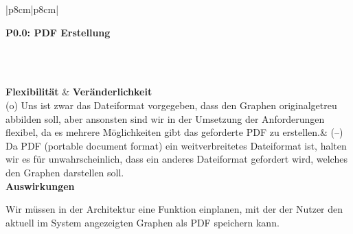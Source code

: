 \documentclass[enabledeprecatedfontcommands,fontsize=11pt,paper=a4,twoside]{scrartcl}
\newcounter{one}
\newcounter{two}[one]
\newcommand{\tone}{0\theone}
\newcommand{\two}{\stepcounter{two}0\thetwo}
\begin{document}
\begin{tabular} {|p{8cm}|p{8cm}|}
	\hline
	 {\parbox{16cm}{\textbf{\hypertarget{kk}{P\tone.\two}: PDF Erstellung}} } \\  \hline\hline 
	\rule{0pt}{6ex}\\ [3ex] \hline
	\textbf{Flexibilität}  & \textbf{Veränderlichkeit} \\
	(o) Uns ist zwar das Dateiformat vorgegeben, dass den Graphen originalgetreu abbilden soll, aber ansonsten sind wir in der Umsetzung der Anforderungen flexibel, da es mehrere Möglichkeiten gibt das geforderte PDF zu erstellen.& 
	(–) Da PDF (portable document format) ein weitverbreitetes Dateiformat ist, halten wir es für unwahrscheinlich, dass ein anderes Dateiformat gefordert wird, welches den Graphen darstellen soll.\\
	\hline
	 {\textbf{Auswirkungen}} \\
	 {\parbox{16cm}{Wir müssen in der Architektur eine Funktion einplanen, mit der der Nutzer den aktuell im System angezeigten Graphen als PDF speichern kann. } }\\ \hline
\end{tabular}
\newpage
\end{document}
